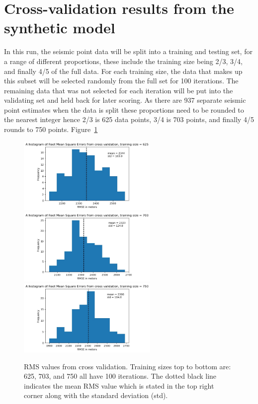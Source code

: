 \section{Cross-validation results from the synthetic model}
In this run, the seismic point data will be split into a training and testing set, for a range of different proportions, these include the training size being 2/3, 3/4, and finally 4/5 of the full data. For each training size, the data that makes up this subset will be selected randomly from the full set for 100 iterations. The remaining data that was not selected for each iteration will be put into the validating set and held back for later scoring. As there are 937 separate seismic point estimates when the data is split these proportions need to be rounded to the nearest integer hence 2/3 is 625 data points, 3/4 is 703 points, and finally 4/5 rounds to 750 points. Figure~\ref{fig:histogram_no_intrusion}
\begin{figure}[h]
  \begin{center}
    \includegraphics[width=0.6\textwidth]{figures/no-intrusion-625}
    \includegraphics[width=0.6\textwidth]{figures/no-intrusion-703}
    \includegraphics[width=0.6\textwidth]{figures/no-intrusion-750}
  \end{center}
  \caption{
   RMS values from cross validation. Training sizes top to bottom are: 625, 703, and 750 all have 100 iterations. The dotted black line indicates the mean RMS value which is stated in the top right corner along with the standard deviation (std).
  }
  \label{fig:histogram_no_intrusion}
\end{figure}
